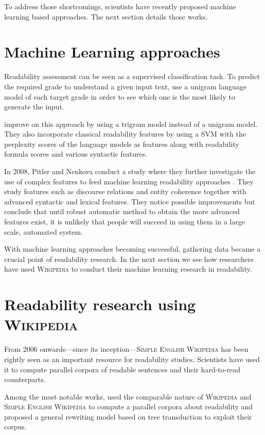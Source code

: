 \documentclass[a4paper, 11pt, onepage]{scrreprt}
\newcommand\wiki{\textsc{Wikipedia}}
\newcommand\sew{\textsc{Simple English Wikipedia}}
\begin{document}
To address those shortcomings, scientists have recently proposed
machine learning based approaches. The next section details those
works.

\section{Machine Learning approaches}
\label{sec:ml-approaches}

Readability assessment can be seen as a supervised classification
task. To predict the required grade to understand a given input text,
\cite{collins2004language} use a unigram language model of each target
grade in order to see which one is the most likely to generate the
input.

\cite{schwarm2005reading} improve on this approach by using a trigram
model instead of a unigram model. They also incorporate classical
readability features by using a SVM with the perplexity scores of the
language models as features along with readability formula scores and
various syntactic features.

In 2008, Pitler and Nenkova conduct a study where they further
investigate the use of complex features to feed machine learning
readability approaches \cite{pitler2008revisiting}. They study
features such as discourse relations and entity coherence together
with advanced syntactic and lexical features. They notice possible
improvements but conclude that until robust automatic method to obtain
the more advanced features exist, it is unlikely that people will
succeed in using them in a large scale, automated system.

With machine learning approaches becoming successful, gathering data
became a crucial point of readability research. In the next section we
see how researchers have used \wiki{} to conduct their machine
learning research in readability.

\section{Readability research using \wiki}
\label{sec:wiki-approaches}

From 2006 onwards—since its inception—\sew{} has been rightly seen as
an important resource for readability studies. Scientists have used it
to compute parallel corpora of readable sentences and their
hard-to-read counterparts.

Among the most notable works, \cite{zhu2010monolingual} used the
comparable nature of \wiki{} and \sew{} to compute a parallel corpora
about readability and proposed a general rewriting model based on tree
transduction to exploit their corpus.
\end{document}

